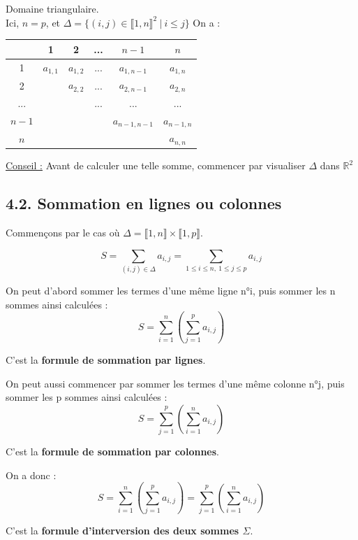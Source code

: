 \documentclass[a4paper,11pt]{article}
\newcommand{\R}{\mathbb{R}}
\newcommand{\intN}[2]{\llbracket #1, #2 \rrbracket}
\newcommand{\ens}[1]{\{#1\}}
\newcommand{\encadLEQ}[3]{#1 \leq #2 \leq #3}
\newcommand{\mot}[1]{\textcolor{bordeaux}{\textbf{#1}}}
\begin{document}
\begin{exemples}
	Domaine triangulaire.\\
	Ici, $n=p$, et $\Delta = \ens{(i, j)\in\intN{1}{n}^2 \: | \: i \leq j}$
	On a :
	\begin{center}
		\begin{tabular}{|c|ccccc|}
			\hline
			& 1 & 2 & ... & $n-1$ & $n$ \\
			\hline
			1 & $a_{1, 1}$ & $a_{1, 2}$ & ... & $a_{1, n-1}$& $a_{1, n}$ \\
			2 & & $a_{2, 2}$ & ... & $a_{2, n-1}$ & $a_{2, n}$ \\
			... & & & ... & ... & ... \\
			$n-1$ & & & & $a_{n-1, n-1}$ & $a_{n-1, n}$ \\
			$n$ & & & & & $a_{n, n}$ \\
			\hline 	
		\end{tabular}
	\end{center}
	
	\underline{Conseil :} Avant de calculer une telle somme, commencer par visualiser $\Delta$ dans $\R^2$
\end{exemples}

\newpage

\subsection*{4.2. Sommation en lignes ou colonnes}

Commençons par le cas où $\Delta = \intN{1}{n} \times \intN{1}{p}$.

$$S = \sum_{(i, j)\in\Delta}a_{i, j} = \sum_{\encadLEQ{1}{i}{n}, \: \encadLEQ{1}{j}{p}}a_{i, j}$$

On peut d'abord sommer les termes d'une même ligne n°i, puis sommer les n sommes ainsi calculées :
$$S = \sum_{i=1}^{n}(\sum_{j=1}^{p}a_{i, j})$$

C'est la \mot{formule de sommation par lignes}.

On peut aussi commencer par sommer les termes d'une même colonne n°j, puis sommer les p sommes ainsi calculées :
$$S = \sum_{j=1}^{p}(\sum_{i=1}^{n}a_{i, j})$$

C'est la \mot{formule de sommation par colonnes}.

On a donc :
$$S =  \sum_{i=1}^{n}(\sum_{j=1}^{p}a_{i, j}) =  \sum_{j=1}^{p}(\sum_{i=1}^{n}a_{i, j})$$

C'est la \mot{formule d'interversion des deux sommes $\Sigma$}.
\end{document}
